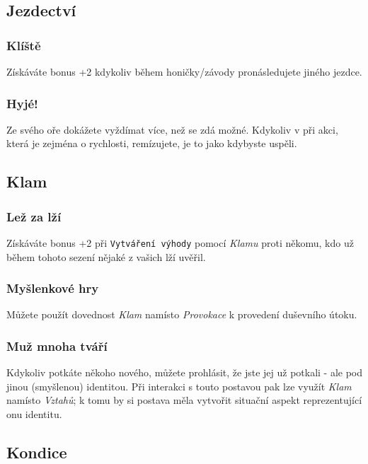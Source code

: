 \subsection{Jezdectví}
\label{sec:trik-jezd}

\subsubsection{Klíště}
\label{sec:jezdectvi-kliste}

Získáváte bonus +2 kdykoliv během honičky/závody pronásledujete jiného jezdce.

\subsubsection{Hyjé!}
\label{sec:jezdectvi-hyje}

Ze svého oře dokážete vyždímat více, než se zdá možné. Kdykoliv v při akci, která je zejména o rychlosti, remízujete, je to jako kdybyste uspěli.

\subsection{Klam}
\label{sec:trik-klam}

\subsubsection{Lež za lží}
\label{sec:klam-lez}
Získáváte bonus +2 při \texttt{Vytváření výhody} pomocí \textit{Klamu} proti někomu, kdo už během tohoto sezení nějaké z vašich lží uvěřil.

\subsubsection{Myšlenkové hry}
\label{sec:klam-mysl}
Můžete použít dovednost \textit{Klam} namísto \textit{Provokace} k provedení duševního útoku.

\subsubsection{Muž mnoha tváří}
\label{sec:klam-muz}
Kdykoliv potkáte někoho nového, můžete prohlásit, že jste jej už potkali - ale pod jinou (smyšlenou) identitou. Při interakci s touto postavou pak lze využít \textit{Klam} namísto \textit{Vztahů}; k tomu by si postava měla vytvořit situační aspekt reprezentující onu identitu.


\subsection{Kondice}
\label{sec:trik-kondice}

